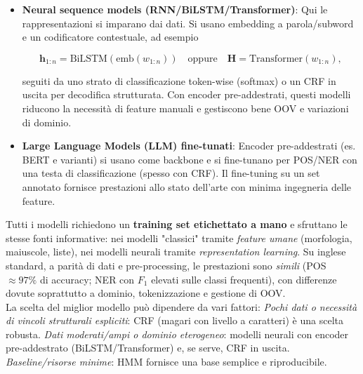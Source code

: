             \begin{itemize}
    
                \item\textbf{Neural sequence models (RNN/BiLSTM/Transformer)}: Qui le rappresentazioni si imparano dai dati. Si usano embedding a parola/subword e un codificatore contestuale, ad esempio
                
                $$
                    \mathbf{h}_{1:n}=\mathrm{BiLSTM}(\mathrm{emb}(w_{1:n}))\quad\text{oppure}\quad \mathbf{H}=\mathrm{Transformer}(w_{1:n}),
                $$
                
                seguiti da uno strato di classificazione token-wise (softmax) o un CRF in uscita per decodifica strutturata. Con encoder pre-addestrati, questi modelli riducono la necessità di feature manuali e gestiscono bene OOV e variazioni di dominio.
                
                \item\textbf{Large Language Models (LLM) fine-tunati}: Encoder pre-addestrati (es. BERT e varianti) si usano come backbone e si fine-tunano per POS/NER con una testa di classificazione (spesso con CRF). Il fine-tuning su un set annotato fornisce prestazioni allo stato dell'arte con minima ingegneria delle feature.
            
            \end{itemize}
            
            Tutti i modelli richiedono un \textbf{training set etichettato a mano} e sfruttano le stesse fonti informative: nei modelli "classici" tramite \emph{feature umane} (morfologia, maiuscole, liste), nei modelli neurali tramite \emph{representation learning}. Su inglese standard, a parità di dati e pre-processing, le prestazioni sono \emph{simili} (POS \(\approx 97\%\) di accuracy; NER con $F_1$ elevati sulle classi frequenti), con differenze dovute soprattutto a dominio, tokenizzazione e gestione di OOV.\\
            
            La scelta del miglior modello può dipendere da vari fattori:\newline
            \emph{Pochi dati o necessità di vincoli strutturali espliciti}: CRF (magari con livello a caratteri) è una scelta robusta.\newline
            \emph{Dati moderati/ampi o dominio eterogeneo}: modelli neurali con encoder pre-addestrato (BiLSTM/Transformer) e, se serve, CRF in uscita.\newline
            \emph{Baseline/risorse minime}: HMM fornisce una base semplice e riproducibile.
     
            